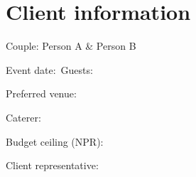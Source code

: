 \section{Client information}
\noindent Couple: Person A \& Person B\par
\noindent Event date:\ \underline{\hspace{45mm}}\quad Guests:\ \underline{\hspace{30mm}}\par
\noindent Preferred venue:\ \underline{\hspace{70mm}}\par
\noindent Caterer:\ \underline{\hspace{80mm}}\par
\noindent Budget ceiling (NPR):\ \underline{\hspace{55mm}}\par
\noindent Client representative:\ \underline{\hspace{65mm}}\par
